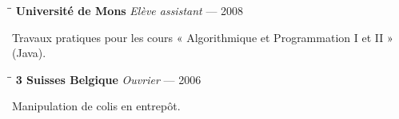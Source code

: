 
\begin{tabbing}
  \hspace{2.3in}\= \hspace{2.6in}\= \kill
  \textbf{Université de Mons} \>\emph{Elève assistant}  — 2008\\
\end{tabbing}\vspace{-30pt}

Travaux pratiques pour les cours « Algorithmique et Programmation I et II » (Java).


\begin{tabbing}
  \hspace{2.3in}\= \hspace{2.6in}\= \kill
  \textbf{3 Suisses Belgique} \>\emph{Ouvrier}  — 2006\\
\end{tabbing}\vspace{-30pt}

Manipulation de colis en entrepôt.

